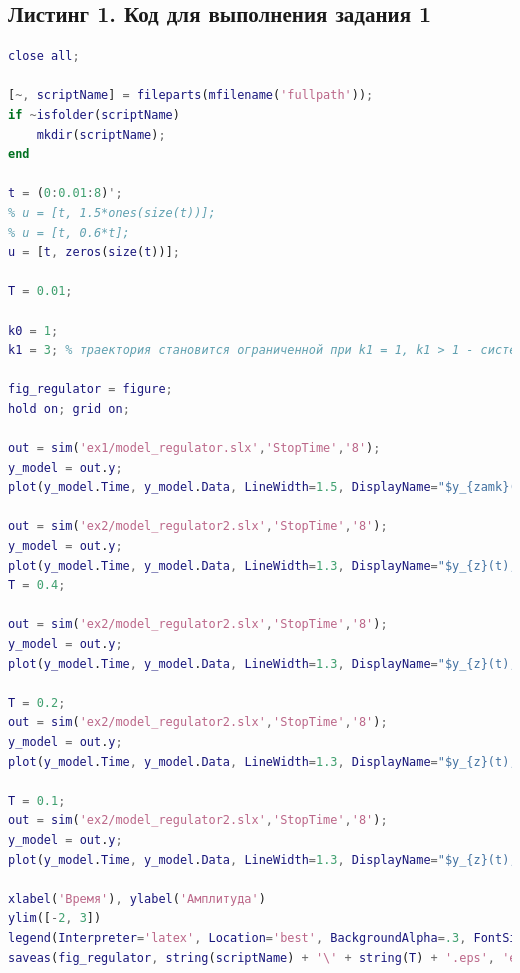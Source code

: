 \documentclass[a4paper]{article}
\begin{document}
\subsection*{Листинг 1. Код для выполнения задания 1}

\begin{lstlisting}[caption={Код для построения графиков для задания 2}, language=matlab]
% clear all;
close all;

[~, scriptName] = fileparts(mfilename('fullpath'));
if ~isfolder(scriptName)
    mkdir(scriptName);
end

t = (0:0.01:8)';
% u = [t, 1.5*ones(size(t))];
% u = [t, 0.6*t];
u = [t, zeros(size(t))];

T = 0.01;

k0 = 1;
k1 = 3; % траектория становится ограниченной при k1 = 1, k1 > 1 - система Ау, k1 < 1 - Ну

fig_regulator = figure;
hold on; grid on;

out = sim('ex1/model_regulator.slx','StopTime','8');
y_model = out.y;
plot(y_model.Time, y_model.Data, LineWidth=1.5, DisplayName="$y_{zamk}(t)$", Color='black')

out = sim('ex2/model_regulator2.slx','StopTime','8');
y_model = out.y;
plot(y_model.Time, y_model.Data, LineWidth=1.3, DisplayName="$y_{z}(t), T = " + string(T) + "$")
T = 0.4;

out = sim('ex2/model_regulator2.slx','StopTime','8');
y_model = out.y;
plot(y_model.Time, y_model.Data, LineWidth=1.3, DisplayName="$y_{z}(t), T = " + string(T) + "$")

T = 0.2;
out = sim('ex2/model_regulator2.slx','StopTime','8');
y_model = out.y;
plot(y_model.Time, y_model.Data, LineWidth=1.3, DisplayName="$y_{z}(t), T = " + string(T) + "$")

T = 0.1;
out = sim('ex2/model_regulator2.slx','StopTime','8');
y_model = out.y;
plot(y_model.Time, y_model.Data, LineWidth=1.3, DisplayName="$y_{z}(t), T = " + string(T) + "$")

xlabel('Время'), ylabel('Амплитуда')
ylim([-2, 3])
legend(Interpreter='latex', Location='best', BackgroundAlpha=.3, FontSize=12, FontName='Computer Modern')
saveas(fig_regulator, string(scriptName) + '\' + string(T) + '.eps', 'epsc')
\end{lstlisting}
\end{document}

